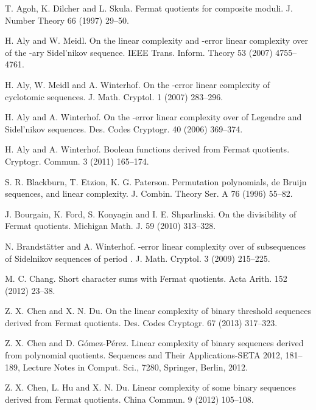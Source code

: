 \documentclass [11pt,a4paper]{article}
\begin{document}
\begin{thebibliography}{99}

 T. Agoh, K. Dilcher and L. Skula.
Fermat quotients for composite moduli.  J.  Number Theory 66
(1997) 29--50.

 H. Aly and  W. Meidl. On the linear complexity and -error linear complexity over  of
the -ary Sidel'nikov sequence. IEEE Trans. Inform. Theory 53 (2007) 4755--4761.

H. Aly,  W. Meidl and A. Winterhof. On the -error linear complexity
of cyclotomic sequences. J. Math. Cryptol. 1 (2007)
283--296.


H. Aly and  A. Winterhof. On the -error linear complexity over  of Legendre
and Sidel'nikov sequences. Des. Codes Cryptogr. 40 (2006) 369--374.

 H. Aly  and A. Winterhof. Boolean functions derived from Fermat
quotients. Cryptogr. Commun. 3 (2011) 165--174.

S. R. Blackburn, T. Etzion, K. G. Paterson.  Permutation
polynomials, de Bruijn sequences, and linear complexity. J. Combin.
Theory Ser. A 76 (1996)  55--82.



J. Bourgain, K. Ford, S. Konyagin and I. E. Shparlinski. On the
divisibility of Fermat quotients. Michigan Math. J. 59 (2010) 313--328.

 N. Brandst\"{a}tter and A. Winterhof. -error linear complexity over   of subsequences of Sidelnikov sequences of period . J. Math. Cryptol. 3 (2009)  215--225.



M. C. Chang. Short character sums with Fermat quotients. Acta Arith.
152 (2012) 23--38.

  Z. X. Chen  and  X. N. Du. On the linear complexity of binary threshold sequences derived from
Fermat quotients. Des. Codes Cryptogr. 67 (2013) 317--323.



Z. X. Chen  and  D. G\'{o}mez-P\'{e}rez. Linear complexity of
binary sequences derived from polynomial quotients. Sequences and Their Applications-SETA 2012, 181--189, Lecture Notes in Comput. Sci., 7280, Springer, Berlin, 2012.

  Z. X. Chen, L. Hu  and  X. N. Du. Linear complexity of some binary sequences derived from Fermat
quotients. China Commun.  9 (2012) 105--108.



\end{thebibliography}
\end{document}
